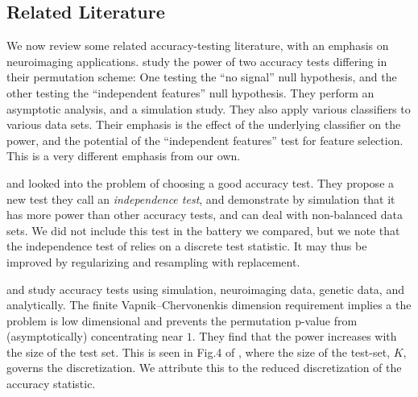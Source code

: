 \documentclass[12pt,a4paper]{article}
\begin{document}
\subsection{Related Literature}
We now review some related accuracy-testing literature, with an emphasis on neuroimaging applications.
\cite{ojala_permutation_2010} study the power of two accuracy tests differing in their permutation scheme:
One testing the ``no signal'' null hypothesis, and the other testing the ``independent features'' null hypothesis. 
They perform an asymptotic analysis, and a simulation study. 
They also apply various classifiers to various data sets. 
Their emphasis is the effect of the underlying classifier on the power, and the potential of the ``independent features'' test for feature selection.
This is a very different emphasis from our own.


\cite{olivetti_induction_2012} and \cite{olivetti_statistical_2014} looked into the problem of choosing a good accuracy test. 
They propose a new test they call an \emph{independence test}, and demonstrate by simulation that it has more power than other accuracy tests, and can deal with non-balanced data sets. 
We did not include this test in the battery we compared, but we note that the independence test of \cite{olivetti_induction_2012} relies on a discrete test statistic. 
It may thus be improved by regularizing and resampling with replacement. 


\cite{golland_permutation_2003} and \cite{golland_permutation_2005} study accuracy tests using simulation, neuroimaging data, genetic data, and analytically.
The finite Vapnik–Chervonenkis dimension requirement \citep[Sec 4.3]{golland_permutation_2005} implies a the problem is low dimensional and prevents the permutation p-value from (asymptotically) concentrating near $1$. 
They find that the power increases with the size of the test set.
This is seen in Fig.4 of \citet{golland_permutation_2005}, where the size of the test-set, $K$, governs the discretization. 
We attribute this to the reduced discretization of the accuracy statistic.
\end{document}

